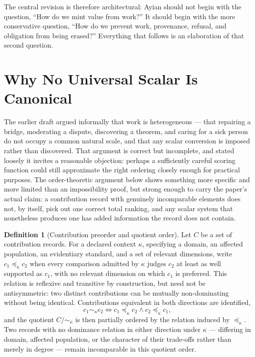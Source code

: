 \documentclass[11pt,oneside]{article}
\theoremstyle{plain}
\theoremstyle{definition}
\newtheorem{definition}{Definition}
\begin{document}
The central revision is therefore architectural: Ayian should not begin with the question, \enquote{How do we mint value from work?} It should begin with the more conservative question, \enquote{How do we prevent work, provenance, refusal, and obligation from being erased?} Everything that follows is an elaboration of that second question.

\section{Why No Universal Scalar Is Canonical}

The earlier draft argued informally that work is heterogeneous --- that repairing a bridge, moderating a dispute, discovering a theorem, and caring for a sick person do not occupy a common natural scale, and that any scalar conversion is imposed rather than discovered. That argument is correct but incomplete, and stated loosely it invites a reasonable objection: perhaps a sufficiently careful scoring function could still approximate the right ordering closely enough for practical purposes. The order-theoretic argument below shows something more specific and more limited than an impossibility proof, but strong enough to carry the paper's actual claim: a contribution record with genuinely incomparable elements does not, by itself, pick out one correct total ranking, and any scalar system that nonetheless produces one has added information the record does not contain.

\begin{definition}[Contribution preorder and quotient order]
Let $C$ be a set of contribution records. For a declared context $\kappa$, specifying a domain, an affected population, an evidentiary standard, and a set of relevant dimensions, write $c_1 \preceq_\kappa c_2$ when every comparison admitted by $\kappa$ judges $c_2$ at least as well supported as $c_1$, with no relevant dimension on which $c_1$ is preferred. This relation is reflexive and transitive by construction, but need not be antisymmetric: two distinct contributions can be mutually non-dominating without being identical. Contributions equivalent in both directions are identified,
\begin{equation}
c_1 \sim_\kappa c_2 \iff c_1 \preceq_\kappa c_2 \land c_2 \preceq_\kappa c_1,
\end{equation}
and the quotient $C/{\sim_\kappa}$ is then partially ordered by the relation induced by $\preceq_\kappa$. Two records with no dominance relation in either direction under $\kappa$ --- differing in domain, affected population, or the character of their trade-offs rather than merely in degree --- remain incomparable in this quotient order.
\end{definition}
\end{document}
